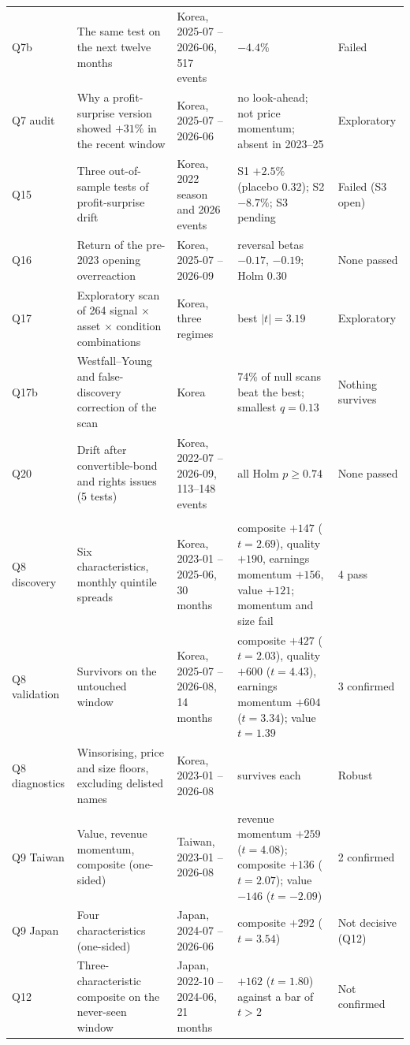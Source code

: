 \documentclass[12pt,a4paper]{article}
\begin{document}
\begin{longtable}{@{}L{1.3cm} L{4.4cm} L{2.6cm} L{4.6cm} L{2.0cm}@{}}
Q7b & The same test on the next twelve months & Korea, 2025-07 -- 2026-06, 517 events & $-4.4\%$ & Failed \\
Q7 audit & Why a profit-surprise version showed $+31\%$ in the recent window & Korea, 2025-07 -- 2026-06 & no look-ahead; not price momentum; absent in 2023--25 & Exploratory \\
Q15 & Three out-of-sample tests of profit-surprise drift & Korea, 2022 season and 2026 events & S1 $+2.5\%$ (placebo 0.32); S2 $-8.7\%$; S3 pending & Failed (S3 open) \\
Q16 & Return of the pre-2023 opening overreaction & Korea, 2025-07 -- 2026-09 & reversal betas $-0.17$, $-0.19$; Holm 0.30 & None passed \\
Q17 & Exploratory scan of 264 signal $\times$ asset $\times$ condition combinations & Korea, three regimes & best $|t|=3.19$ & Exploratory \\
Q17b & Westfall--Young and false-discovery correction of the scan & Korea & 74\% of null scans beat the best; smallest $q=0.13$ & Nothing survives \\
Q20 & Drift after convertible-bond and rights issues (5 tests) & Korea, 2022-07 -- 2026-09, 113--148 events & all Holm $p\ge 0.74$ & None passed \\
\addlinespace
{} \\
Q8 discovery & Six characteristics, monthly quintile spreads & Korea, 2023-01 -- 2025-06, 30 months & composite $+147$ ($t=2.69$), quality $+190$, earnings momentum $+156$, value $+121$; momentum and size fail & 4 pass \\
Q8 validation & Survivors on the untouched window & Korea, 2025-07 -- 2026-08, 14 months & composite $+427$ ($t=2.03$), quality $+600$ ($t=4.43$), earnings momentum $+604$ ($t=3.34$); value $t=1.39$ & 3 confirmed \\
Q8 diagnostics & Winsorising, price and size floors, excluding delisted names & Korea, 2023-01 -- 2026-08 & survives each & Robust \\
Q9 Taiwan & Value, revenue momentum, composite (one-sided) & Taiwan, 2023-01 -- 2026-08 & revenue momentum $+259$ ($t=4.08$); composite $+136$ ($t=2.07$); value $-146$ ($t=-2.09$) & 2 confirmed \\
Q9 Japan & Four characteristics (one-sided) & Japan, 2024-07 -- 2026-06 & composite $+292$ ($t=3.54$) & Not decisive (Q12) \\
Q12 & Three-characteristic composite on the never-seen window & Japan, 2022-10 -- 2024-06, 21 months & $+162$ ($t=1.80$) against a bar of $t>2$ & Not confirmed \\

\end{longtable}
\end{document}

